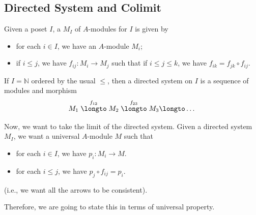 \subsection{Directed System and Colimit}
\begin{definition}
Given a poset $I$, a  $M_I$
of $A$-modules for $I$ is given by
\begin{itemize}
    \item for each $i\in I$, we have an $A$-module $M_i$;
    \item if $i\leq j$, we have $f_{ij} : M_i\to M_j$
	such that if $i\leq j\leq k$, we have
	$f_{ik} = f_{jk} \circ f_{ij}$.
\end{itemize}
\end{definition}
\begin{example}
    If $I=\mathbb N$ ordered by the usual $\leq$,
    then a directed system on $I$ is a sequence of modules
    and morphism
    $$M_1 \stackrel{f_{12}}\longto M_2 \stackrel{f_{23}}\longto M_3 \longto \dots$$
\end{example}
Now, we want to take the limit of the directed system.
Given a directed system $M_I$, we want a universal $A$-module $M$
such that 
\begin{itemize}
    \item for each $i\in I$, we have $p_i : M_i\to M$.
    \item for each $i\leq j$, we have $p_j\circ f_{ij} = p_i$.
\end{itemize}
(i.e., we want all the arrows to be consistent).
\begin{center}
\end{center}
Therefore, we are going to state this
in terms of universal property.

